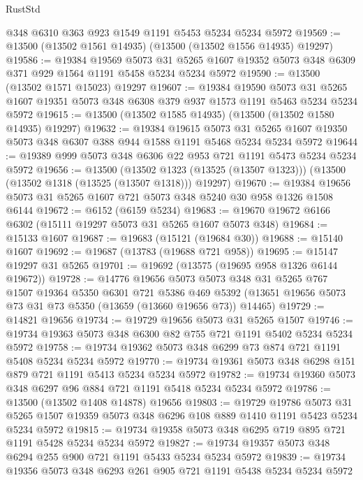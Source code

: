 \begin{lexlean}{RustStd}
\begin{coremodule}
    @348
    @6310
    @363
    @923
    @1549
    @1191
    @5453
    @5234
    @5234
    @5972
@19569 := @13500 (@13502 @1561 @14935) (@13500 (@13502 @1556 @14935) @19297)
@19586 := @19384
    @19569
    @5073
    @31
    @5265
    @1607
    @19352
    @5073
    @348
    @6309
    @371
    @929
    @1564
    @1191
    @5458
    @5234
    @5234
    @5972
@19590 := @13500 (@13502 @1571 @15023) @19297
@19607 := @19384
    @19590
    @5073
    @31
    @5265
    @1607
    @19351
    @5073
    @348
    @6308
    @379
    @937
    @1573
    @1191
    @5463
    @5234
    @5234
    @5972
@19615 := @13500 (@13502 @1585 @14935) (@13500 (@13502 @1580 @14935) @19297)
@19632 := @19384
    @19615
    @5073
    @31
    @5265
    @1607
    @19350
    @5073
    @348
    @6307
    @388
    @944
    @1588
    @1191
    @5468
    @5234
    @5234
    @5972
@19644 := @19389 @999 @5073 @348 @6306 @22 @953 @721 @1191 @5473 @5234 @5234 @5972
@19656 := @13500
    (@13502 @1323 (@13525 (@13507 @1323)))
    (@13500 (@13502 @1318 (@13525 (@13507 @1318))) @19297)
@19670 := @19384 @19656 @5073 @31 @5265 @1607 @721 @5073 @348 @5240 @30 @958 @1326 @1508 @6144
@19672 := @6152 (@6159 @5234)
@19683 := @19670 @19672 @6166 @6302 (@15111 @19297 @5073 @31 @5265 @1607 @5073 @348)
@19684 := @15133 @1607
@19687 := @19683 (@15121 (@19684 @30))
@19688 := @15140 @1607
@19692 := @19687 (@13783 (@19688 @721 @958))
@19695 := @15147 @19297 @31 @5265
@19701 := @19692 (@13575 (@19695 @958 @1326 @6144 @19672))
@19728 := @14776
    @19656
    @5073
    @5073
    @348
    @31
    @5265
    @767
    @1507
    @19364
    @5350
    @6301
    @721
    @5386
    @469
    @5392
    (@13651 @19656 @5073 @73 @31 @73 @5350 (@13659 (@13660 @19656 @73)) @14465)
@19729 := @14821 @19656
@19734 := @19729 @19656 @5073 @31 @5265 @1507
@19746 := @19734 @19363 @5073 @348 @6300 @82 @755 @721 @1191 @5402 @5234 @5234 @5972
@19758 := @19734 @19362 @5073 @348 @6299 @73 @874 @721 @1191 @5408 @5234 @5234 @5972
@19770 := @19734 @19361 @5073 @348 @6298 @151 @879 @721 @1191 @5413 @5234 @5234 @5972
@19782 := @19734 @19360 @5073 @348 @6297 @96 @884 @721 @1191 @5418 @5234 @5234 @5972
@19786 := @13500 (@13502 @1408 @14878) @19656
@19803 := @19729
    @19786
    @5073
    @31
    @5265
    @1507
    @19359
    @5073
    @348
    @6296
    @108
    @889
    @1410
    @1191
    @5423
    @5234
    @5234
    @5972
@19815 := @19734 @19358 @5073 @348 @6295 @719 @895 @721 @1191 @5428 @5234 @5234 @5972
@19827 := @19734 @19357 @5073 @348 @6294 @255 @900 @721 @1191 @5433 @5234 @5234 @5972
@19839 := @19734 @19356 @5073 @348 @6293 @261 @905 @721 @1191 @5438 @5234 @5234 @5972

\end{coremodule}
\end{lexlean}
